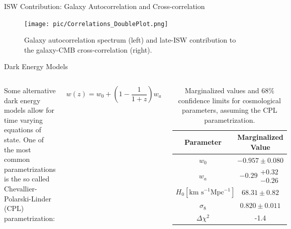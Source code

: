 \documentclass[serif, aspectratio=169]{beamer}
\begin{document}
\begin{frame}{ISW Contribution: Galaxy Autocorrelation and Cross-correlation}
    \begin{figure}
        \centering
        \texttt{[image: pic/Correlations\_DoublePlot.png]}
        \caption{Galaxy autocorrelation spectrum (left) and late-ISW contribution to the galaxy-CMB
cross-correlation (right).}
        \label{fig:ISWplots_Cgg_and_Ctg}
    \end{figure}
\end{frame}

\iffalse %
\begin{frame}{Dark Energy Models} %
	\begin{columns}
	
	Some alternative dark energy models allow for time varying equations of state. One of the most common parametrizations is the so called Chevallier-Polarski-Linder (CPL) parametrization:
	
	\begin{equation}
		w(z)=w_0+\left(1-\frac{1}{1+z}\right)w_a
	\end{equation}
	
	
	\begin{table}[!htb]
    \centering
    \begin{tabular}{cc} \hline
     Parameter & Marginalized Value \\ \hline
     $w_0$ & $-0.957\pm0.080$\\
     $w_a$ & $-0.29\substack{+0.32 \\ -0.26}$\\
     $H_0 [\text{km s}^{-1}\text{Mpc}^{-1}]$ & $68.31\pm0.82$ \\
     $\sigma_8$ & $0.820\pm 0.011$\\ \hline
     $\Delta \chi^2$ & -1.4 \\ \hline
    \end{tabular}
    \caption{Marginalized values and $68\%$ confidence limits for cosmological parameters, assuming the CPL parametrization.}
    \label{tab:planck_CPL}
\end{table}
	\end{columns}
\end{frame}
\end{document}
